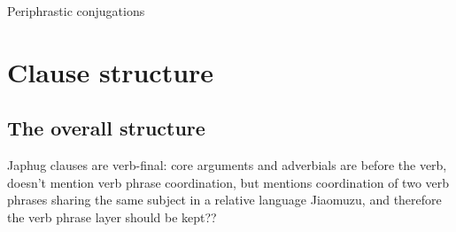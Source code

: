\documentclass[a4paper, oneside, 12pt]{report}
\newcommand*{\citepage}[1]{p.~{#1}}
\begin{document}
Periphrastic conjugations 

\chapter{Clause structure}

\section{The overall structure}

Japhug clauses are verb-final:
core arguments and adverbials are before the verb, 
\citet{jacques2021grammar} doesn't mention verb phrase coordination,
but \citet[\citepage{549}]{prins2011web} mentions 
coordination of two verb phrases sharing the same subject
in a relative language Jiaomuzu,
and therefore the verb phrase layer should be kept??



\end{document}
